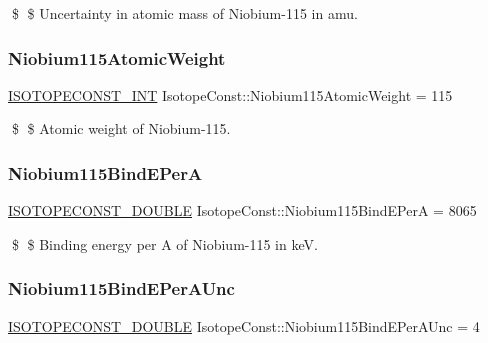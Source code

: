 \$ \$ Uncertainty in atomic mass of Niobium-\/115 in amu. \mbox{\label{group___isotope_const-_niobium-_nb115_ga875aefdf1fdce2bceb9e8cf411745089}} 
\subsubsection{\texorpdfstring{Niobium115\+Atomic\+Weight}{Niobium115AtomicWeight}}
{\footnotesize\ttfamily \mbox{\hyperlink{group___isotope_const-_macros_ga5f18360b3e99483a35c32d789e62621c}{I\+S\+O\+T\+O\+P\+E\+C\+O\+N\+S\+T\+\_\+\+I\+NT}} Isotope\+Const\+::\+Niobium115\+Atomic\+Weight = 115}

\$ \$ Atomic weight of Niobium-\/115. \mbox{\label{group___isotope_const-_niobium-_nb115_gaf2f6bb42bbddd3f7e6cefebb282bcc0e}} 
\subsubsection{\texorpdfstring{Niobium115\+Bind\+E\+PerA}{Niobium115BindEPerA}}
{\footnotesize\ttfamily \mbox{\hyperlink{group___isotope_const-_macros_ga8f45a7272ce02c0b4c65c44636ed719a}{I\+S\+O\+T\+O\+P\+E\+C\+O\+N\+S\+T\+\_\+\+D\+O\+U\+B\+LE}} Isotope\+Const\+::\+Niobium115\+Bind\+E\+PerA = 8065}

\$ \$ Binding energy per A of Niobium-\/115 in keV. \mbox{\label{group___isotope_const-_niobium-_nb115_ga376154d79f86730085e8b0f2beb2293d}} 
\subsubsection{\texorpdfstring{Niobium115\+Bind\+E\+Per\+A\+Unc}{Niobium115BindEPerAUnc}}
{\footnotesize\ttfamily \mbox{\hyperlink{group___isotope_const-_macros_ga8f45a7272ce02c0b4c65c44636ed719a}{I\+S\+O\+T\+O\+P\+E\+C\+O\+N\+S\+T\+\_\+\+D\+O\+U\+B\+LE}} Isotope\+Const\+::\+Niobium115\+Bind\+E\+Per\+A\+Unc = 4}

